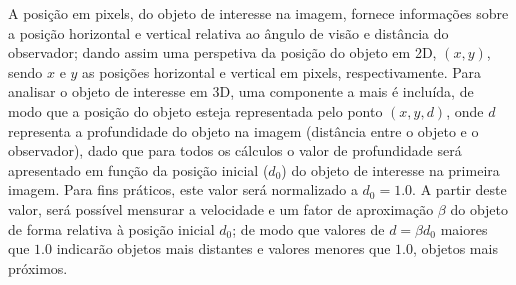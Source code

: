 A posição em pixels, do objeto de interesse na imagem, fornece informações 
sobre a posição horizontal e vertical relativa ao ângulo de visão e 
distância do observador; dando assim uma perspetiva 
da posição do objeto em 2D, $(x, y)$, sendo $x$ e $y$ as posições 
horizontal e vertical em pixels, respectivamente. Para analisar o objeto de interesse em 
3D, uma componente a mais é incluída, de modo que a posição do objeto esteja representada
pelo ponto $(x, y, d)$, onde $d$ representa a profundidade 
do objeto na imagem (distância entre o objeto e o observador), 
dado que para todos os cálculos o valor de profundidade
será apresentado em função da posição inicial ($d_0$) 
do objeto de interesse na primeira imagem.
Para fins práticos, este valor será normalizado a $d_0=1.0$.
A partir
deste valor, será possível mensurar a velocidade e um fator de aproximação $\beta$ do objeto
de forma relativa à posição inicial $d_0$; de modo que valores de $d=\beta d_0$
maiores que $1.0$ indicarão objetos mais distantes e valores menores que $1.0$, objetos mais próximos.

